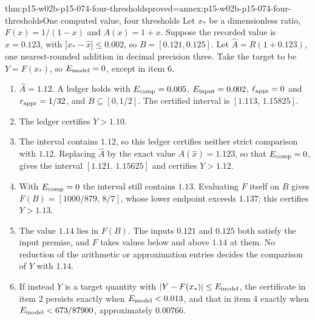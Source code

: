 \begin{hbtheorem}{thm:p15-w02b-p15-074-four-thresholds}{proved=annex:p15-w02b-p15-074-four-thresholds}{One computed value, four thresholds}
Let \(x_*\) be a dimensionless ratio, \(F(x)=1/(1-x)\) and
\(A(x)=1+x\). Suppose the recorded value is \(\widehat x=0.123\), with
\(|x_*-\widehat x|\leq0.002\), so \(B=[0.121,0.125]\). Let
\(\widehat A=R(1+0.123)\), one nearest-rounded addition in decimal
precision three. Take the target to be \(Y=F(x_*)\), so
\(E_{\rm model}=0\), except in item 6.
\begin{enumerate}
\item \(\widehat A=1.12\). A ledger holds with \(E_{\rm comp}=0.005\),
\(E_{\rm input}=0.002\), \(\ell_{\rm appr}=0\) and
\(r_{\rm appr}=1/32\), and \(B\subseteq[0,1/2]\). The certified interval
is \([1.113,\,1.15825]\).
\item The ledger certifies \(Y>1.10\).
\item The interval contains \(1.12\), so this ledger certifies neither
strict comparison with \(1.12\). Replacing \(\widehat A\) by the exact
value \(A(\widehat x)=1.123\), so that \(E_{\rm comp}=0\), gives the interval
\([1.121,\,1.15625]\) and certifies \(Y>1.12\).
\item With \(E_{\rm comp}=0\) the interval still contains \(1.13\).
Evaluating \(F\) itself on \(B\) gives
\(F(B)=[1000/879,\,8/7]\), whose lower endpoint exceeds \(1.137\);
this certifies \(Y>1.13\).
\item The value \(1.14\) lies in \(F(B)\). The inputs \(0.121\) and
\(0.125\) both satisfy the input premise, and \(F\) takes values below and
above \(1.14\) at them. No reduction of the arithmetic or approximation
entries decides the comparison of \(Y\) with \(1.14\).
\item If instead \(Y\) is a target quantity with
\(|Y-F(x_*)|\leq E_{\rm model}\), the certificate in item 2 persists
exactly when \(E_{\rm model}<0.013\), and that in item 4 exactly when
\(E_{\rm model}<673/87900\), approximately \(0.00766\).
\end{enumerate}
\end{hbtheorem}

